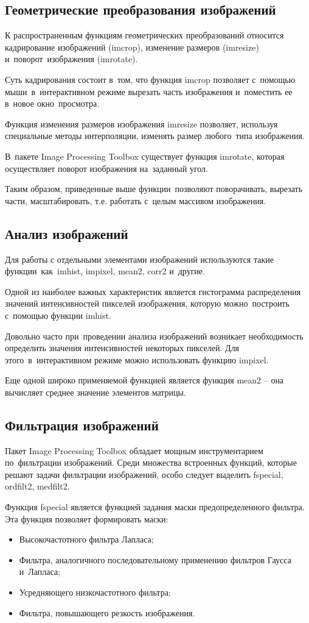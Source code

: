 \documentclass{ou}
\begin{document}
\subsection{Геометрические преобразования изображений}
К распространенным функциям геометрических преобразований относится кадрирование изображений (imcrop), изменение размеров (imresize) и~поворот~изображения (imrotate).

Суть кадрирования состоит в~том, что функция imcrop позволяет с~помощью мыши~в~интерактивном режиме вырезать часть изображения и~поместить ее в~новое окно~просмотра.

Функция изменения размеров изображения imresize позволяет, используя специальные методы интерполяции, изменять размер любого~типа изображения.

В~пакете Image Processing Toolbox существует функция imrotate, которая осуществляет поворот изображения на~заданный угол.

Таким образом, приведенные выше функции~позволяют поворачивать, вырезать части, масштабировать, т.е. работать с~целым массивом изображения.
\subsection{Анализ изображений}
Для работы с отдельными элементами изображений используются такие функции~как~imhist, impixel, mean2, corr2 и~другие.

Одной из наиболее важных характеристик является гистограмма распределения значений интенсивностей пикселей изображения, которую можно~построить с~помощью функции imhist.

Довольно часто при~проведении анализа изображений возникает необходимость определить значения интенсивностей некоторых пикселей. Для этого~в~интерактивном режиме можно использовать функцию impixel.

Еще одной широко применяемой функцией является функция mean2 -- она вычисляет среднее значение элементов матрицы.
\subsection{Фильтрация изображений}
Пакет Image Processing Toolbox обладает мощным инструментарием по~фильтрации изображений. Среди множества встроенных функций, которые решают задачи фильтрации изображений, особо следует выделить fspecial, ordfilt2, medfilt2.

Функция fspecial является функцией задания маски предопределенного фильтра. Эта функция позволяет формировать маски:
\begin{itemize}[label=-, itemindent=2em, nosep]
\item Высокочастотного фильтра Лапласа;
\item Фильтра, аналогичного последовательному применению фильтров Гаусса и~Лапласа;
\item Усредняющего низкочастотного фильтра;
\item Фильтра, повышающего резкость изображения.
\end{itemize}
\end{document}

